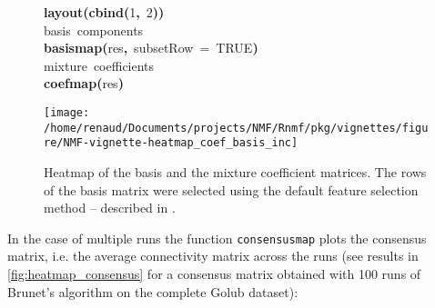 \documentclass[a4paper]{article}\usepackage{graphicx, color}
\makeatletter
\def\maxwidth{ %
  \ifdim\Gin@nat@width>\linewidth
    \linewidth
  \else
    \Gin@nat@width
  \fi
}
\newcommand{\hlnumber}[1]{\textcolor[rgb]{0,0,0}{#1}}%
\newcommand{\hlfunctioncall}[1]{\textcolor[rgb]{0.501960784313725,0,0.329411764705882}{\textbf{#1}}}%
\newcommand{\hlkeyword}[1]{\textcolor[rgb]{0,0,0}{\textbf{#1}}}%
\newcommand{\hlargument}[1]{\textcolor[rgb]{0.690196078431373,0.250980392156863,0.0196078431372549}{#1}}%
\newcommand{\hlcomment}[1]{\textcolor[rgb]{0.180392156862745,0.6,0.341176470588235}{#1}}%
\newcommand{\hlsymbol}[1]{\textcolor[rgb]{0,0,0}{#1}}%
\newcommand{\hlstd}[1]{\textcolor[rgb]{0,0,0}{#1}}%
\newenvironment{kframe}{%
 \def\FrameCommand##1{\hskip\@totalleftmargin \hskip-\fboxsep
 \colorbox{shadecolor}{##1}\hskip-\fboxsep
     \hskip-\linewidth \hskip-\@totalleftmargin \hskip\columnwidth}%
 \MakeFramed {\advance\hsize-\width
   \@totalleftmargin\z@ \linewidth\hsize
   \@setminipage}}%
 {\par\unskip\endMakeFramed}
\newenvironment{knitrout}{}{} %
\let\code=\texttt
\makeatother
\begin{document}
\begin{figure}[ht]
\centering
\begin{knitrout}
\color{fgcolor}\begin{kframe}
\begin{flushleft}
\ttfamily\noindent
\hlfunctioncall{layout}\hlkeyword{(}\hlfunctioncall{cbind}\hlkeyword{(}\hlnumber{1}\hlkeyword{,}{\ }\hlnumber{2}\hlkeyword{)}\hlkeyword{)}\hspace*{\fill}\\
\hlstd{}\hlcomment{\usebox{\hlnormalsizeboxhash}{\ }basis{\ }components}\hspace*{\fill}\\
\hlstd{}\hlfunctioncall{basismap}\hlkeyword{(}\hlsymbol{res}\hlkeyword{,}{\ }\hlargument{subsetRow}{\ }\hlargument{=}{\ }\hlnumber{TRUE}\hlkeyword{)}\hspace*{\fill}\\
\hlstd{}\hlcomment{\usebox{\hlnormalsizeboxhash}{\ }mixture{\ }coefficients}\hspace*{\fill}\\
\hlstd{}\hlfunctioncall{coefmap}\hlkeyword{(}\hlsymbol{res}\hlkeyword{)}\mbox{}
\normalfont
\end{flushleft}
\end{kframe}\texttt{[image: /home/renaud/Documents/projects/NMF/Rnmf/pkg/vignettes/figure/NMF-vignette-heatmap\_coef\_basis\_inc]} 
\end{knitrout}

\caption{Heatmap of the basis and the mixture coefficient matrices. The rows of the basis matrix were selected using the default feature selection method -- described in \cite{KimH2007}.}
\label{fig:heatmap_coef_basis}
\end{figure}

In the case of multiple runs the function \code{consensusmap} plots the consensus matrix, i.e. the average connectivity matrix across the runs (see results in \cref{fig:heatmap_consensus} for a consensus matrix obtained with 100 runs of Brunet's algorithm on the complete 
Golub dataset):
\end{document}
